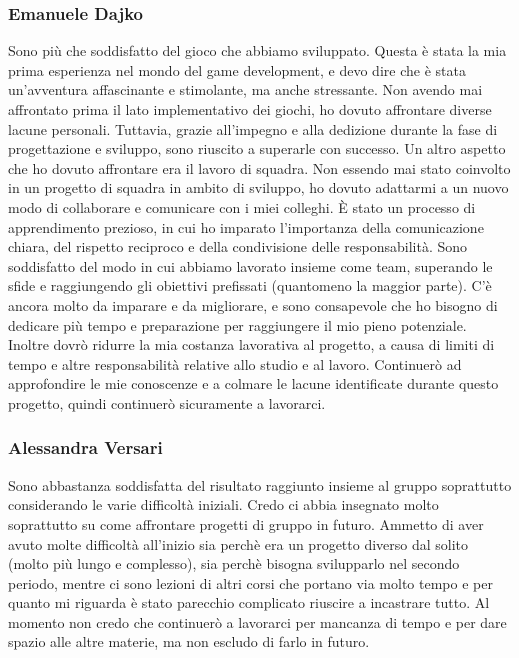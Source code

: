 \documentclass[a4paper,12pt]{report}
\begin{document}
\subsubsection{Emanuele Dajko}
Sono più che soddisfatto del gioco che abbiamo sviluppato.
Questa è stata la mia prima esperienza nel mondo del game development, e devo dire che è stata un'avventura affascinante e stimolante, ma anche stressante.
Non avendo mai affrontato prima il lato implementativo dei giochi, ho dovuto affrontare diverse lacune personali.
Tuttavia, grazie all'impegno e alla dedizione durante la fase di progettazione e sviluppo, sono riuscito a superarle con successo.
Un altro aspetto che ho dovuto affrontare era il lavoro di squadra.
Non essendo mai stato coinvolto in un progetto di squadra in ambito di sviluppo, ho dovuto adattarmi a un nuovo modo di collaborare e comunicare con i miei colleghi.
È stato un processo di apprendimento prezioso, in cui ho imparato l'importanza della comunicazione chiara, del rispetto reciproco e della condivisione delle responsabilità.
Sono soddisfatto del modo in cui abbiamo lavorato insieme come team, superando le sfide e raggiungendo gli obiettivi prefissati (quantomeno la maggior parte).
C'è ancora molto da imparare e da migliorare, e sono consapevole che ho bisogno di dedicare più tempo e preparazione per raggiungere il mio pieno potenziale.
Inoltre dovrò ridurre la mia costanza lavorativa al progetto, a causa di limiti di tempo e altre responsabilità relative allo studio e al lavoro.
Continuerò ad approfondire le mie conoscenze e a colmare le lacune identificate durante questo progetto, quindi continuerò sicuramente a lavorarci.

\subsubsection{Alessandra Versari}
Sono abbastanza soddisfatta del risultato raggiunto insieme al gruppo soprattutto considerando le varie difficoltà iniziali. Credo ci abbia insegnato molto soprattutto su come affrontare progetti di gruppo in futuro. Ammetto di aver avuto molte difficoltà all'inizio sia perchè era un progetto diverso dal solito (molto più lungo e complesso), sia perchè bisogna svilupparlo nel secondo periodo, mentre ci sono lezioni di altri corsi che portano via molto tempo e per quanto mi riguarda è stato parecchio complicato riuscire a incastrare tutto. Al momento non credo che continuerò a lavorarci per mancanza di tempo e per dare spazio alle altre materie, ma non escludo di farlo in futuro. 
\end{document}
